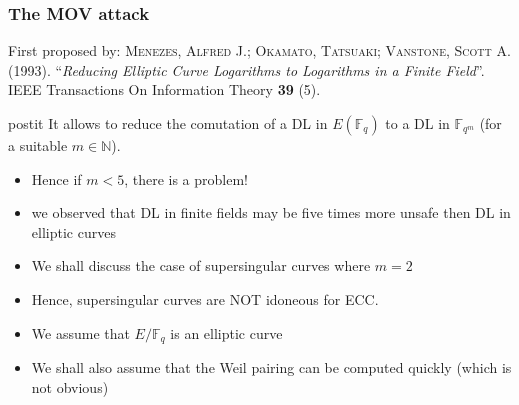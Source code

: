 \documentclass[10pt,handout]{beamer} %
\newcommand{\N}{\mathbb N}
\newcommand{\F}{\mathbb F}
\theoremstyle{definition}
\begin{document}
\begin{frame}
 \frametitle{The MOV attack}\pause
 
First proposed by:
\textsc{Menezes, Alfred J.; Okamato, Tatsuaki; Vanstone, Scott A.} (1993). 
``\textit{Reducing Elliptic Curve Logarithms to Logarithms in a Finite Field}''. 
IEEE Transactions On Information Theory \textbf{39} (5).\bigskip\pause

 \begin{beamercolorbox}[shadow=true,center,rounded=true,wd=\textwidth]{postit}
  It allows to reduce the comutation of a DL in $E(\F_q)$ to a DL in $\F_{q^m}$ (for a suitable $m\in\N$).
 \end{beamercolorbox}\bigskip\pause
 
 \begin{itemize}[<+-| alert@+>]
  \item  Hence if $m<5$, there is a problem!
  \item we observed that DL in finite fields may be five times more unsafe then
 DL in elliptic curves
 \item  We shall discuss the case of supersingular curves where $m=2$
 \item  Hence, supersingular curves are NOT idoneous for ECC.
\item We assume that $E/\F_q$ is an elliptic curve
\item We shall also assume that the Weil pairing can be computed quickly (which is not obvious)
 \end{itemize}
\end{frame}
\end{document}
